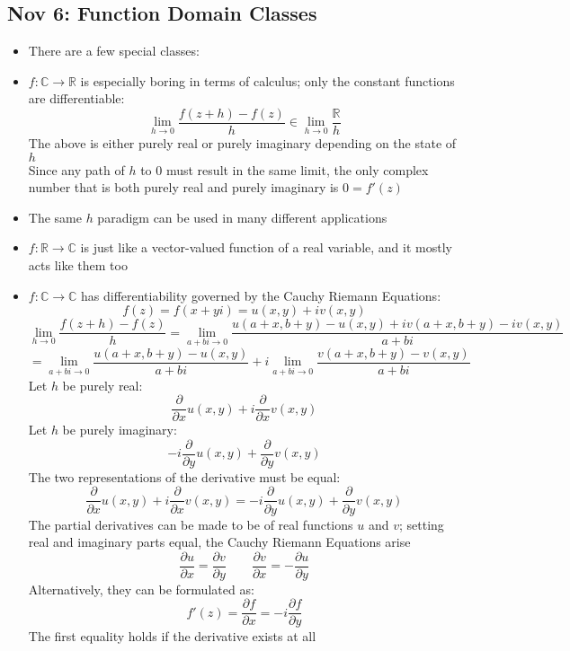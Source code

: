 \documentclass[10pt, oneside]{article}
\let\del\partial
\newcommand{\ltz}[1]{\lim_{#1 \rightarrow 0}}
\newcommand{\R}{\mathbb{R}}
\newcommand{\C}{\mathbb{C}}
\begin{document}
\subsection{Nov 6: Function Domain Classes}
\begin{itemize}
    \item There are a few special classes:
    \item $f : \C \rightarrow \R$ is especially boring in terms of calculus; only the constant functions are differentiable:
        \[\ltz{h} \frac{f(z+h) - f(z)}{h} \in \ltz{h} \frac{\R}{h}\]
        The above is either purely real or purely imaginary depending on the state of $h$\\
        Since any path of $h$ to $0$ must result in the same limit, the only complex number that is both purely real and purely imaginary is $0 = f'(z)$
    \item The same $h$ paradigm can be used in many different applications
    \item $f : \R \rightarrow \C$ is just like a vector-valued function of a real variable, and it mostly acts like them too
    \item $f : \C \rightarrow \C$ has differentiability governed by the Cauchy Riemann Equations:
        \[f(z) = f(x + yi) = u(x,y) + i v(x,y)\]
        \[\ltz{h} \frac{f(z+h) - f(z)}{h} = \ltz{a + bi} \frac{u(a + x, b + y) - u(x,y) + iv(a + x, b + y) - iv(x,y)}{a + bi}\]
        \[= \ltz{a+bi} \frac{u(a + x, b + y) - u(x,y)}{a + bi} + i \ltz{a+bi} \frac{v(a + x, b + y) - v(x,y)}{a + bi}\]
        Let $h$ be purely real:
        \[\frac{\del}{\del x} u(x,y) + i \frac{\del}{\del x} v(x,y)\]
        Let $h$ be purely imaginary:
        \[-i\frac{\del}{\del y} u(x,y) +  \frac{\del}{\del y} v(x,y)\]
        The two representations of the derivative must be equal:
        \[\frac{\del}{\del x} u(x,y) + i \frac{\del}{\del x} v(x,y) = -i\frac{\del}{\del y} u(x,y) +  \frac{\del}{\del y} v(x,y)\]
        The partial derivatives can be made to be of real functions $u$ and $v$; setting real and imaginary parts equal, the Cauchy Riemann Equations arise
        \[\frac{\del u}{\del x} = \frac{\del v}{\del y} \quad \quad \frac{\del v}{\del x} = -\frac{\del u}{\del y}\]
        Alternatively, they can be formulated as:
        \[f'(z) = \frac{\del f}{\del x} = -i\frac{\del f}{\del y}\]
        The first equality holds if the derivative exists at all
\end{itemize}
\end{document}

